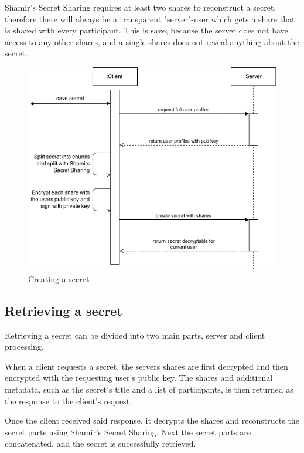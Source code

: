 Shamir's Secret Sharing requires at least two shares to reconstruct a secret,
therefore there will always be a transparent "server"-user which gets a share
that is shared with every participant. This is save, because the server does
not have access to any other shares, and a single shares does not reveal
anything about the secret.

\begin{figure}
  \includegraphics[scale=0.55]{pictures/create_secret_sequence_diagram.png}
  \caption{Creating a secret}
  \label{fig:creating_a_secret}
\end{figure}

\subsection{Retrieving a secret}

Retrieving a secret can be divided into two main parts, server and client
processing.

When a client requests a secret, the servers shares are first decrypted and
then encrypted with the requesting user's public key. The shares and additional
metadata, such as the secret's title and a list of participants, is then
returned as the response to the client's request.

Once the client received said response, it decrypts the shares and reconstructs
the secret parts using Shamir's Secret Sharing. Next the secret parts are
concatenated, and the secret is successfully retrieved.

